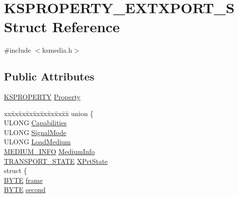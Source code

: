 \hypertarget{struct_k_s_p_r_o_p_e_r_t_y___e_x_t_x_p_o_r_t___s}{}\section{K\+S\+P\+R\+O\+P\+E\+R\+T\+Y\+\_\+\+E\+X\+T\+X\+P\+O\+R\+T\+\_\+S Struct Reference}
\label{struct_k_s_p_r_o_p_e_r_t_y___e_x_t_x_p_o_r_t___s}


{\ttfamily \#include $<$ksmedia.\+h$>$}

\subsection*{Public Attributes}
\begin{DoxyCompactItemize}
\item 
\hyperlink{ks_8h_a4392f77c74e868d813d46c39ada4d660}{K\+S\+P\+R\+O\+P\+E\+R\+TY} \hyperlink{struct_k_s_p_r_o_p_e_r_t_y___e_x_t_x_p_o_r_t___s_a9406c9ff9077db49d3459e9c0054324c}{Property}
\item 
\begin{tabbing}
xx\=xx\=xx\=xx\=xx\=xx\=xx\=xx\=xx\=\kill
union \{\\
\>ULONG \hyperlink{struct_k_s_p_r_o_p_e_r_t_y___e_x_t_x_p_o_r_t___s_a7c61fd1ad6265d4255dddc96a601952b}{Capabilities}\\
\>ULONG \hyperlink{struct_k_s_p_r_o_p_e_r_t_y___e_x_t_x_p_o_r_t___s_a8739601ee14cc5c77df966c8d156632c}{SignalMode}\\
\>ULONG \hyperlink{struct_k_s_p_r_o_p_e_r_t_y___e_x_t_x_p_o_r_t___s_a6fdd1aa2a14d39c45d6c2ae06968586a}{LoadMedium}\\
\>\hyperlink{struct_m_e_d_i_u_m___i_n_f_o}{MEDIUM\_INFO} \hyperlink{struct_k_s_p_r_o_p_e_r_t_y___e_x_t_x_p_o_r_t___s_a322b6f1f8328715646c8918f920f8ac8}{MediumInfo}\\
\>\hyperlink{struct_t_r_a_n_s_p_o_r_t___s_t_a_t_e}{TRANSPORT\_STATE} \hyperlink{struct_k_s_p_r_o_p_e_r_t_y___e_x_t_x_p_o_r_t___s_a466b92a96dadcd08d2624cf9a55fbe9f}{XPrtState}\\
\>struct \{\\
\>\>\hyperlink{mapinls_8h_a4ae1dab0fb4b072a66584546209e7d58}{BYTE} \hyperlink{struct_k_s_p_r_o_p_e_r_t_y___e_x_t_x_p_o_r_t___s_aeb29dd5101f15468e89d458afb4c9c7f}{frame}\\
\>\>\hyperlink{mapinls_8h_a4ae1dab0fb4b072a66584546209e7d58}{BYTE} \hyperlink{struct_k_s_p_r_o_p_e_r_t_y___e_x_t_x_p_o_r_t___s_a74f32de395e90eac27e78be8ed214f5b}{second}\\

\end{tabbing}
\end{DoxyCompactItemize}
